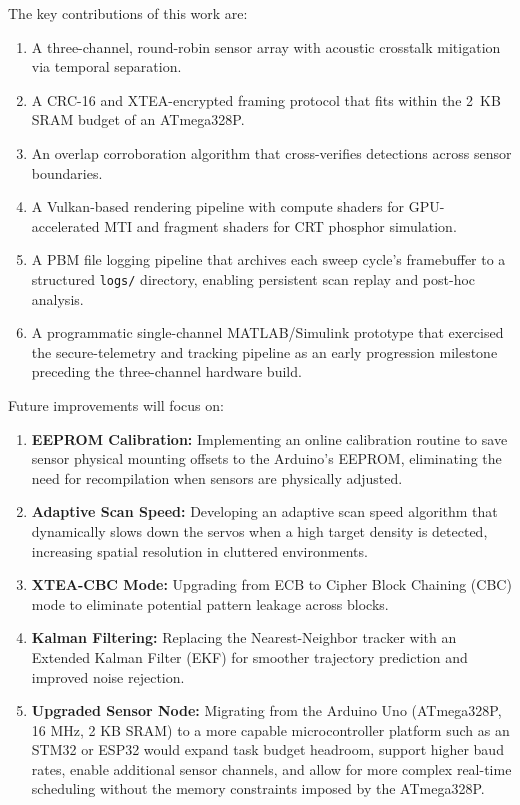 \documentclass[conference]{IEEEtran}
\begin{document}
The key contributions of this work are:
\begin{enumerate}
    \item A three-channel, round-robin sensor array with acoustic crosstalk mitigation via temporal separation.
    \item A CRC-16 and XTEA-encrypted framing protocol that fits within the 2~KB SRAM budget of an ATmega328P.
    \item An overlap corroboration algorithm that cross-verifies detections across sensor boundaries.
    \item A Vulkan-based rendering pipeline with compute shaders for GPU-accelerated MTI and fragment shaders for CRT phosphor simulation.
    \item A PBM file logging pipeline that archives each sweep cycle's framebuffer to a structured \texttt{logs/} directory, enabling persistent scan replay and post-hoc analysis.
    \item A programmatic single-channel MATLAB/Simulink prototype that exercised the secure-telemetry and tracking pipeline as an early progression milestone preceding the three-channel hardware build.
\end{enumerate}

Future improvements will focus on:
\begin{enumerate}
    \item \textbf{EEPROM Calibration:} Implementing an online calibration routine to save sensor physical mounting offsets to the Arduino's EEPROM, eliminating the need for recompilation when sensors are physically adjusted.
    \item \textbf{Adaptive Scan Speed:} Developing an adaptive scan speed algorithm that dynamically slows down the servos when a high target density is detected, increasing spatial resolution in cluttered environments.
    \item \textbf{XTEA-CBC Mode:} Upgrading from ECB to Cipher Block Chaining (CBC) mode to eliminate potential pattern leakage across blocks.
    \item \textbf{Kalman Filtering:} Replacing the Nearest-Neighbor tracker with an Extended Kalman Filter (EKF) for smoother trajectory prediction and improved noise rejection.
    \item \textbf{Upgraded Sensor Node:} Migrating from the Arduino Uno (ATmega328P, 16 MHz, 2 KB SRAM) to a more capable microcontroller platform such as an STM32 or ESP32 would expand task budget headroom, support higher baud rates, enable additional sensor channels, and allow for more complex real-time scheduling without the memory constraints imposed by the ATmega328P.
\end{enumerate}



\end{document}
